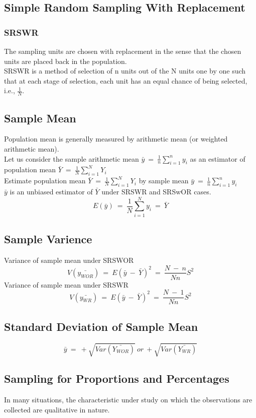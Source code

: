 \subsection*{Simple Random Sampling With Replacement}
\subsubsection*{SRSWR}
The sampling units are chosen with replacement in the sense that
the chosen units are placed back in the population.\\
SRSWR is a method of selection of n units out of the N units one by
one such that at each stage of selection, each unit has an equal
chance of being selected, i.e., $\frac{1}{N}$.

\subsection*{Sample Mean}
Population mean is generally measured by arithmetic mean (or
weighted arithmetic mean).\\
Let us consider the sample arithmetic mean $\bar{y}\ =\ \frac{1}{n}\sum_{i=1}^{n}y_i$ as an estimator of population mean $\bar{Y}\ =\ \frac{1}{N}\sum_{i=1}^{N}Y_i$\\
Estimate population mean $\bar{Y}\ =\ \frac{1}{N}\sum_{i=1}^{N}Y_i$ by sample mean $\bar{y}\ =\ \frac{1}{n}\sum_{i=1}^{n}y_i$\\
$\bar{y}$ is an unbiased estimator of $\bar{Y}$ under SRSWR and SRSwOR cases. 
\[ E(\bar{y})\ =\ \frac{1}{N}\sum_{i=1}^{N}y_i\ =\ \bar{Y}\]

\subsection*{Sample Varience}
Variance of sample mean under SRSWOR
\[ V(\bar{y_{WOR}})\ =\ E(\bar{y}\ -\ \bar{Y})^2\ =\ \frac{N\ -\ n}{Nn}S^2 \]
Variance of sample mean under SRSWR
\[ V(\bar{y_{WR}})\ =\ E(\bar{y}\ -\ \bar{Y})^2\ =\ \frac{N\ -\ 1}{Nn}S^2 \]

\subsection*{Standard Deviation of Sample Mean}
\[ \bar{y}\ =\ +\sqrt{Var(\bar{Y_{WOR}})}\ or\ +\sqrt{Var(\bar{Y_{WR}})} \]

\subsection*{Sampling for Proportions and Percentages}
In many situations, the characteristic under study on which the
observations are collected are qualitative in nature.
